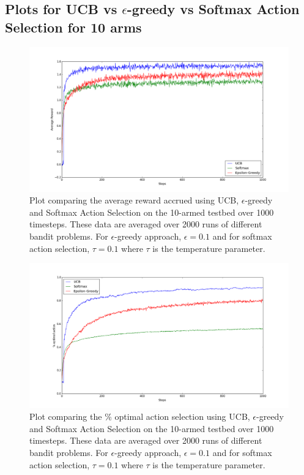 \documentclass[english]{article}
\begin{document}
\subsection{Plots for UCB vs $\epsilon$-greedy vs Softmax Action Selection for 10 arms}
\begin{figure}[H]
  \includegraphics[width=\linewidth]{compare_ucb_10_arms_average_reward.png}
  \caption{Plot comparing the average reward accrued using UCB, $\epsilon$-greedy and Softmax Action Selection on the 10-armed testbed over 1000 timesteps. These data are averaged over 2000 runs of different bandit problems. For $\epsilon$-greedy approach, $\epsilon = 0.1 $ and for softmax action selection, $\tau = 0.1$ where $\tau$ is the temperature parameter.}
  \label{fig:eg1}
\end{figure}

\begin{figure}[H]
  \includegraphics[width=\linewidth]{compare_ucb_10_arms_optimal_action.png}
  \caption{Plot comparing the \% optimal action selection using UCB, $\epsilon$-greedy and Softmax Action Selection on the 10-armed testbed over 1000 timesteps. These data are averaged over 2000 runs of different bandit problems. For $\epsilon$-greedy approach, $\epsilon = 0.1 $ and for softmax action selection, $\tau = 0.1$ where $\tau$ is the temperature parameter.}
  \label{fig:eg1}
\end{figure}
\end{document}
